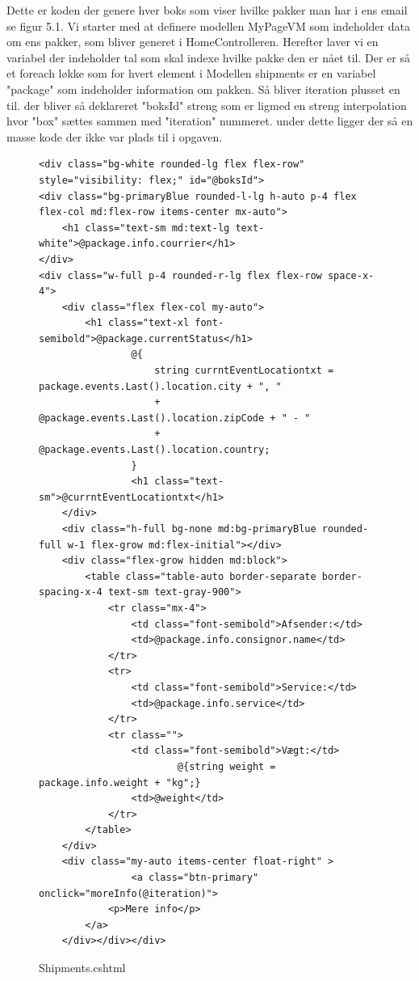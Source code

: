 Dette er koden der genere hver boks som viser hvilke pakker man har i ens email se figur 5.1. Vi starter med at 
definere modellen MyPageVM som indeholder data om ens pakker, som bliver generet i HomeControlleren.
Herefter laver vi en variabel der indeholder tal som skal indexe hvilke pakke den er nået til. Der er så 
et foreach løkke som for hvert element i Modellen shipments er en variabel "package" som indeholder information
om pakken. Så bliver iteration plusset en til. der bliver så deklareret "boksId" streng som er ligmed en streng interpolation
hvor "box" sættes sammen med "iteration" nummeret. under dette ligger der så en masse kode der ikke var plads til i opgaven.
\newpage
\begin{figure}[!h]
    \begin{verbatim}
<div class="bg-white rounded-lg flex flex-row" style="visibility: flex;" id="@boksId">
<div class="bg-primaryBlue rounded-l-lg h-auto p-4 flex flex-col md:flex-row items-center mx-auto">
    <h1 class="text-sm md:text-lg text-white">@package.info.courrier</h1>
</div>
<div class="w-full p-4 rounded-r-lg flex flex-row space-x-4">
    <div class="flex flex-col my-auto">
        <h1 class="text-xl font-semibold">@package.currentStatus</h1>
                @{
                    string currntEventLocationtxt = package.events.Last().location.city + ", " 
                    + @package.events.Last().location.zipCode + " - " 
                    + @package.events.Last().location.country;
                }
                <h1 class="text-sm">@currntEventLocationtxt</h1>
    </div>
    <div class="h-full bg-none md:bg-primaryBlue rounded-full w-1 flex-grow md:flex-initial"></div>
    <div class="flex-grow hidden md:block">
        <table class="table-auto border-separate border-spacing-x-4 text-sm text-gray-900">
            <tr class="mx-4">
                <td class="font-semibold">Afsender:</td>
                <td>@package.info.consignor.name</td>
            </tr>
            <tr>
                <td class="font-semibold">Service:</td>
                <td>@package.info.service</td>
            </tr>
            <tr class="">
                <td class="font-semibold">Vægt:</td>
                        @{string weight = package.info.weight + "kg";}
                <td>@weight</td>
            </tr>
        </table>
    </div>
    <div class="my-auto items-center float-right" >
                <a class="btn-primary" onclick="moreInfo(@iteration)">
            <p>Mere info</p>
        </a>
    </div></div></div>
\end{verbatim}
\caption{Shipments.cshtml}
\label{code:Shipments.cs}
\end{figure}

